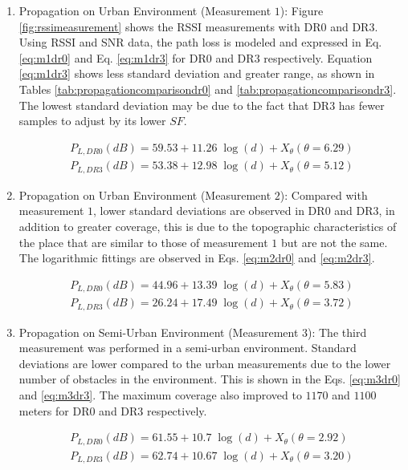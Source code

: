 \begin{enumerate}

\item Propagation on Urban Environment (Measurement $1$): Figure \ref{fig:rssimeasurement} shows the RSSI measurements with DR$0$ and DR$3$. Using RSSI and SNR data, the path loss is modeled and expressed in Eq. \eqref{eq:m1dr0} and Eq. \eqref{eq:m1dr3} for DR$0$ and DR$3$ respectively. Equation \eqref{eq:m1dr3} shows less standard deviation and greater range, as shown in Tables \ref{tab:propagationcomparisondr0} and \ref{tab:propagationcomparisondr3}. The lowest standard deviation may be due to the fact that DR$3$ has fewer samples to adjust by its lower $SF$.

\begin{eqnarray} 
P_{L,DR0}(dB) = 59.53+11.26\;\log(d)+X_\theta(\theta=6.29) \label{eq:m1dr0}\\
P_{L,DR3}(dB) = 53.38+12.98\;\log(d)+X_\theta(\theta=5.12) \label{eq:m1dr3}
\end{eqnarray}

\item Propagation on Urban Environment (Measurement $2$): Compared with measurement $1$, lower standard deviations are observed in DR$0$ and DR$3$, in addition to greater coverage, this is due to the topographic characteristics of the place that are similar to those of measurement $1$ but are not the same. The logarithmic fittings are observed in Eqs. \eqref{eq:m2dr0} and \eqref{eq:m2dr3}.

\begin{eqnarray} 
P_{L,DR0}(dB) = 44.96+13.39\;\log(d)+X_\theta(\theta=5.83) \label{eq:m2dr0} \\
P_{L,DR3}(dB) = 26.24+17.49\;\log(d)+X_\theta(\theta=3.72)  \label{eq:m2dr3}
\end{eqnarray}

\item Propagation on Semi-Urban Environment (Measurement $3$): The third measurement was performed in a semi-urban environment. Standard deviations are lower compared to the urban measurements due to the lower number of obstacles in the environment. This is shown in the Eqs. \eqref{eq:m3dr0} and \eqref{eq:m3dr3}. The maximum coverage also improved to $1170$ and $1100$ meters for DR$0$ and DR$3$ respectively.

\begin{eqnarray}
P_{L,DR0}(dB) = 61.55+10.7\;\log(d)+X_\theta(\theta=2.92) \label{eq:m3dr0} \\
P_{L,DR3}(dB) = 62.74+10.67\;\log(d)+X_\theta(\theta=3.20) \label{eq:m3dr3}
\end{eqnarray}


\end{enumerate}
